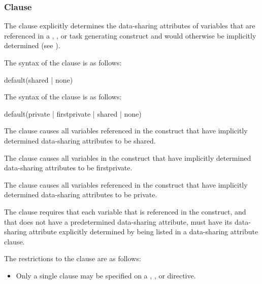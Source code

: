 {{{{\subsubsection{ Clause}
\label{subsubsec:default clause}
\summary
The  clause explicitly determines the data-sharing attributes of variables that 
are referenced in a , , or task generating construct
and would otherwise be implicitly determined (see
).

\syntax
\ccppspecificstart
The syntax of the  clause is as follows:

\begin{boxedcode}
default(shared \textnormal{|} none)
\end{boxedcode}
\ccppspecificend

\fortranspecificstart
The syntax of the  clause is as follows:

\begin{boxedcode}
default(private \textnormal{|} firstprivate \textnormal{|} shared \textnormal{|} none)
\end{boxedcode}
\fortranspecificend

\descr
The  clause causes all variables referenced in the construct that 
have implicitly determined data-sharing attributes to be shared.

\fortranspecificstart
The  clause causes all variables in the construct that have 
implicitly determined data-sharing attributes to be firstprivate.

The  clause causes all variables referenced in the construct that 
have implicitly determined data-sharing attributes to be private.
\fortranspecificend

The  clause requires that each variable that is referenced in the 
construct, and that does not have a predetermined data-sharing attribute, must have its 
data-sharing attribute explicitly determined by being listed in a data-sharing attribute 
clause. 

\restrictions
The restrictions to the  clause are as follows:

\begin{itemize}
\item Only a single  clause may be specified on a 
, ,  or  directive.
\end{itemize}









}}}}

